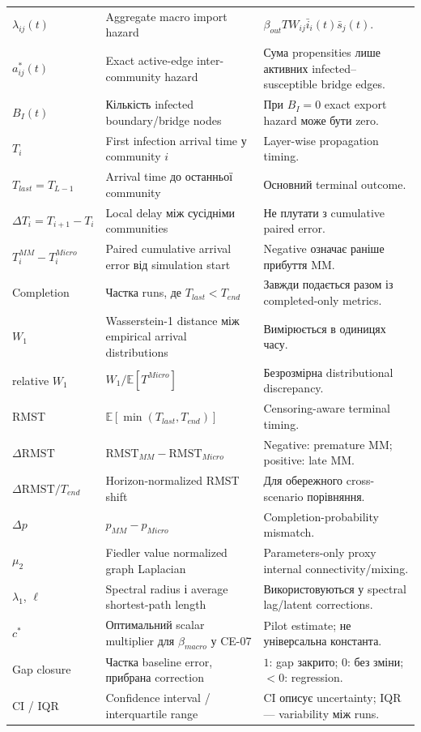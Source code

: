 \documentclass[11pt,a4paper]{article}
\begin{document}
\begin{longtable}{p{3.0cm}p{7.0cm}p{4.3cm}}
$\lambda_{ij}(t)$ & Aggregate macro import hazard & $\beta_{out}T W_{ij}\bar i_i(t)\bar s_j(t)$.\\
$a^*_{ij}(t)$ & Exact active-edge inter-community hazard & Сума propensities лише активних infected--susceptible bridge edges.\\
$B_I(t)$ & Кількість infected boundary/bridge nodes & При $B_I=0$ exact export hazard може бути zero.\\
$T_i$ & First infection arrival time у community $i$ & Layer-wise propagation timing.\\
$T_{last}=T_{L-1}$ & Arrival time до останньої community & Основний terminal outcome.\\
$\Delta T_i=T_{i+1}-T_i$ & Local delay між сусідніми communities & Не плутати з cumulative paired error.\\
$T_i^{MM}-T_i^{Micro}$ & Paired cumulative arrival error від simulation start & Negative означає раніше прибуття MM.\\
Completion & Частка runs, де $T_{last}<T_{end}$ & Завжди подається разом із completed-only metrics.\\
$W_1$ & Wasserstein-1 distance між empirical arrival distributions & Вимірюється в одиницях часу.\\
relative $W_1$ & $W_1/\mathbb E[T^{Micro}]$ & Безрозмірна distributional discrepancy.\\
RMST & $\mathbb E[\min(T_{last},T_{end})]$ & Censoring-aware terminal timing.\\
$\Delta\mathrm{RMST}$ & $\mathrm{RMST}_{MM}-\mathrm{RMST}_{Micro}$ & Negative: premature MM; positive: late MM.\\
$\Delta\mathrm{RMST}/T_{end}$ & Horizon-normalized RMST shift & Для обережного cross-scenario порівняння.\\
$\Delta p$ & $p_{MM}-p_{Micro}$ & Completion-probability mismatch.\\
$\mu_2$ & Fiedler value normalized graph Laplacian & Parameters-only proxy internal connectivity/mixing.\\
$\lambda_1$, $\ell$ & Spectral radius і average shortest-path length & Використовуються у spectral lag/latent corrections.\\
$c^*$ & Оптимальний scalar multiplier для $\beta_{macro}$ у CE-07 & Pilot estimate; не універсальна константа.\\
Gap closure & Частка baseline error, прибрана correction & $1$: gap закрито; $0$: без зміни; $<0$: regression.\\
CI / IQR & Confidence interval / interquartile range & CI описує uncertainty; IQR --- variability між runs.\\
\bottomrule
\end{longtable}
\normalsize
\end{document}
